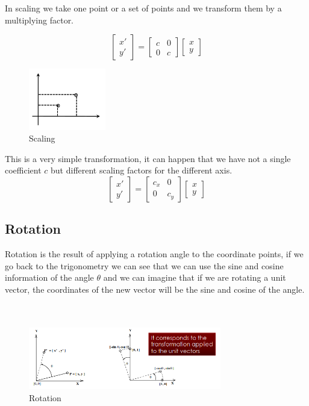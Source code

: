 In scaling we take one point or a set of points and we transform them by a multiplying factor. 

\[
\begin{bmatrix}
    x' \\
    y'
    \end{bmatrix}
    =
    \begin{bmatrix}
    c & 0 \\
    0 & c
    \end{bmatrix}
    \begin{bmatrix}
    x \\
    y
    \end{bmatrix}
\]

\begin{figure}[ht]
    \centering
    \includegraphics[width=0.3\textwidth]{Figures/scaling.png}
    \caption{Scaling}
    \label{fig:scaling}
\end{figure}

This is a very simple transformation, it can happen that we have not a single coefficient \(c\) but different scaling factors for the different axis.
\[
\begin{bmatrix}
    x' \\
    y'
    \end{bmatrix}
    =
    \begin{bmatrix}
    c_x & 0 \\
    0 & c_y
    \end{bmatrix}
    \begin{bmatrix}
    x \\
    y
    \end{bmatrix}
\]

\subsection{Rotation}

Rotation is the result of applying a rotation angle to the coordinate points, if we go back to the trigonometry we can see that we can use the sine and cosine information of the angle \(\theta\) and we can imagine that if we are rotating a unit vector, the coordinates of the new vector will be the sine and cosine of the angle.
\\\\\\
\begin{figure}[ht]
    \centering
    \includegraphics[width=0.75\textwidth]{Figures/rotation.png}
    \caption{Rotation}
    \label{fig:rotation}
\end{figure}

